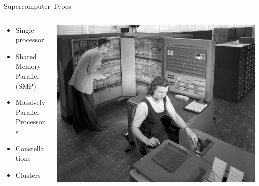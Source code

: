 \begin{frame}{Supercomputer Types}
\begin{columns}
\begin{column}{0.5\textwidth}
\begin{itemize}
\item Single processor
\item Shared Memory Parallel (SMP)
\item Massively Parallel Processors
\item Constellations
\item Clusters
\end{itemize}
\end{column}
\begin{column}{0.5\textwidth}
\begin{center}
\includegraphics[width=\textwidth]{figures/mainframe.jpg}
\end{center}
\end{column}
\end{columns}
\end{frame}

